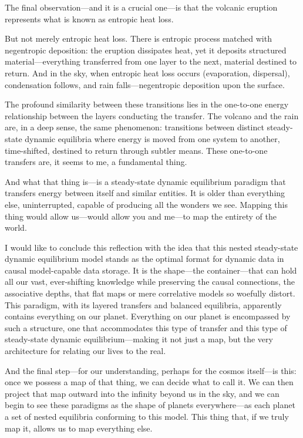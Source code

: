 The final observation—and it is a crucial one—is that the volcanic eruption represents what is known as entropic heat loss.

But not merely entropic heat loss. There is entropic process matched with negentropic deposition: the eruption dissipates heat, yet it deposits structured material—everything transferred from one layer to the next, material destined to return. And in the sky, when entropic heat loss occurs (evaporation, dispersal), condensation follows, and rain falls—negentropic deposition upon the surface.

The profound similarity between these transitions lies in the one-to-one energy relationship between the layers conducting the transfer. The volcano and the rain are, in a deep sense, the same phenomenon: transitions between distinct steady-state dynamic equilibria where energy is moved from one system to another, time-shifted, destined to return through subtler means. These one-to-one transfers are, it seems to me, a fundamental thing.

And what that thing is—is a steady-state dynamic equilibrium paradigm that transfers energy between itself and similar entities. It is older than everything else, uninterrupted, capable of producing all the wonders we see. Mapping this thing would allow us—would allow you and me—to map the entirety of the world.

I would like to conclude this reflection with the idea that this nested steady-state dynamic equilibrium model stands as the optimal format for dynamic data in causal model-capable data storage. It is the shape—the container—that can hold all our vast, ever-shifting knowledge while preserving the causal connections, the associative depths, that flat maps or mere correlative models so woefully distort. This paradigm, with its layered transfers and balanced equilibria, apparently contains everything on our planet. Everything on our planet is encompassed by such a structure, one that accommodates this type of transfer and this type of steady-state dynamic equilibrium—making it not just a map, but the very architecture for relating our lives to the real.

And the final step—for our understanding, perhaps for the cosmos itself—is this: once we possess a map of that thing, we can decide what to call it. We can then project that map outward into the infinity beyond us in the sky, and we can begin to see these paradigms as the shape of planets everywhere—as each planet a set of nested equilibria conforming to this model. This thing that, if we truly map it, allows us to map everything else.
